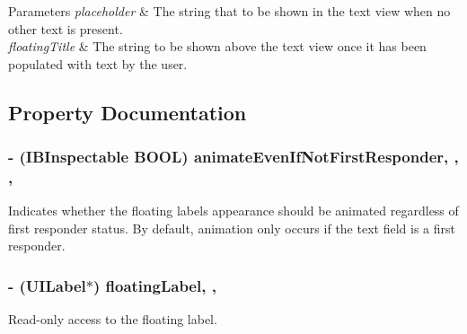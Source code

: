\begin{DoxyParams}{Parameters}
{\em placeholder} & The string that to be shown in the text view when no other text is present. \\
\hline
{\em floating\+Title} & The string to be shown above the text view once it has been populated with text by the user. \\
\hline
\end{DoxyParams}


\subsection{Property Documentation}
\hypertarget{interface_j_v_float_labeled_text_view_a2d654f540a5f9878e31f7583cc05f6f1}{}
\subsubsection[{animate\+Even\+If\+Not\+First\+Responder}]{\setlength{\rightskip}{0pt plus 5cm}-\/ (I\+B\+Inspectable B\+O\+O\+L) animate\+Even\+If\+Not\+First\+Responder\hspace{0.3cm}{\ttfamily [read]}, {\ttfamily [write]}, {\ttfamily [nonatomic]}, {\ttfamily [assign]}}\label{interface_j_v_float_labeled_text_view_a2d654f540a5f9878e31f7583cc05f6f1}
Indicates whether the floating label\textquotesingle{}s appearance should be animated regardless of first responder status. By default, animation only occurs if the text field is a first responder. \hypertarget{interface_j_v_float_labeled_text_view_a9267bda83c69a187acf332dd71bd6eb1}{}
\subsubsection[{floating\+Label}]{\setlength{\rightskip}{0pt plus 5cm}-\/ (U\+I\+Label$\ast$) floating\+Label\hspace{0.3cm}{\ttfamily [read]}, {\ttfamily [nonatomic]}, {\ttfamily [strong]}}\label{interface_j_v_float_labeled_text_view_a9267bda83c69a187acf332dd71bd6eb1}
Read-\/only access to the floating label. \hypertarget{interface_j_v_float_labeled_text_view_aeafbd8422f4d37317d1dc65c5827d884}{}
